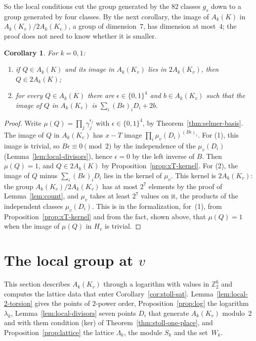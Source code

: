 \documentclass[11pt]{amsart}
\newtheorem{corollary}[theorem]{Corollary}
\theoremstyle{definition}
\numberwithin{equation}{section}
\newcommand{\Zt}{\mathbb{Z}_2}
\newcommand{\kv}{K_v}
\newcommand{\lean}[1]{\ignorespaces}
\begin{document}
So the local conditions cut the group generated by the $82$ classes $g_s$ down to a group generated by four classes. By the next corollary, the image of $A_k(K)$ in $A_k(\kv)/2A_k(\kv)$, a group of dimension~$7$, has dimension at most~$4$; the proof does not need to know whether it is smaller.

\begin{corollary}\label{cor:selmer-consequences}\lean{FurioLombardo.M3a.Route.hloc_jac, FurioLombardo.Discharge.M3a.selmerInjective_of_indep, FurioLombardo.Discharge.M4Box.hSel_of_selmerBasis}
For $k=0,1$:
\begin{enumerate}
\item if $Q\in A_k(K)$ and its image in $A_k(\kv)$ lies in $2A_k(\kv)$, then $Q\in2A_k(K)$;
\item for every $Q\in A_k(K)$ there are $\epsilon\in\{0,1\}^4$ and $b\in A_k(\kv)$ such that the image of $Q$ in $A_k(\kv)$ is $\sum_i(B\epsilon)_iD_i+2b$.
\end{enumerate}
\end{corollary}

\begin{proof}
Write $\mu(Q)=\prod_j\gamma_j^{\epsilon_j}$ with $\epsilon\in\{0,1\}^4$, by Theorem~\ref{thm:selmer-basis}. The image of $Q$ in $A_k(\kv)$ has $x-T$ image $\prod_i\mu_v(D_i)^{(B\epsilon)_i}$. For (1), this image is trivial, so $B\epsilon\equiv0\pmod2$ by the independence of the $\mu_v(D_i)$ (Lemma~\ref{lem:local-divisors}), hence $\epsilon=0$ by the left inverse of $B$. Then $\mu(Q)=1$, and $Q\in2A_k(K)$ by Proposition~\ref{prop:xT-kernel}. For (2), the image of $Q$ minus $\sum_i(B\epsilon)_iD_i$ lies in the kernel of $\mu_v$. This kernel is $2A_k(\kv)$: the group $A_k(\kv)/2A_k(\kv)$ has at most $2^7$ elements by the proof of Lemma~\ref{lem:count}, and $\mu_v$ takes at least $2^7$ values on it, the products of the independent classes $\mu_v(D_i)$. This is  in the formalization, for~(1), from Proposition~\ref{prop:xT-kernel} and from the fact, shown above, that $\mu(Q)=1$ when the image of $\mu(Q)$ in $H_v$ is trivial.
\end{proof}

\section{The local group at \texorpdfstring{$v$}{v}}\label{sec:local}

This section describes $A_k(\kv)$ through a logarithm with values in $\Zt^6$ and computes the lattice data that enter Corollary~\ref{cor:stoll-sat}. Lemma~\ref{lem:local-2-torsion} gives the points of $2$-power order, Proposition~\ref{prop:log} the logarithm $\lambda_k$, Lemma~\ref{lem:local-divisors} seven points $D_i$ that generate $A_k(\kv)$ modulo~$2$ and with them condition (ker) of Theorem~\ref{thm:stoll-one-place}, and Proposition~\ref{prop:lattice} the lattice $\Lambda_k$, the module $S_k$ and the set~$W_k$.
\end{document}
